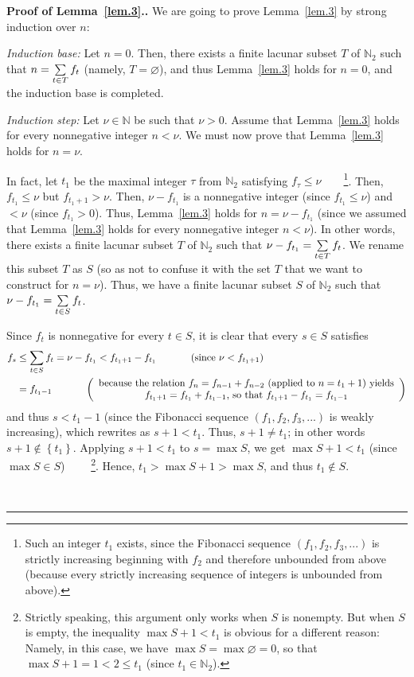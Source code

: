 \documentclass[numbers=enddot,12pt,final,onecolumn,notitlepage]{scrartcl}%
\numberwithin{exer}{section}
\theoremstyle{definition}
\newenvironment{proof}[1][Proof]{\noindent\textbf{#1.} }{\ \rule{0.5em}{0.5em}}
\let\sumnonlimits\sum
\renewcommand{\sum}{\sumnonlimits\limits}
\begin{document}
\begin{proof}[Proof of Lemma~\ref{lem.3}.] We are going to prove Lemma~\ref{lem.3} by strong induction
over $n$:

\textit{Induction base:} Let $n=0$. Then, there exists a finite lacunar subset
$T$ of $\mathbb{N}_{2}$ such that $n=\sum\limits_{t\in T}f_{t}$ (namely,
$T=\varnothing$), and thus Lemma~\ref{lem.3} holds for $n=0$, and the induction base is completed.

\textit{Induction step:} Let $\nu\in\mathbb{N}$ be such that $\nu>0$. Assume
that Lemma~\ref{lem.3} holds for every nonnegative integer $n<\nu$. We must now prove
that Lemma~\ref{lem.3} holds for $n=\nu$.

In fact, let $t_{1}$ be the maximal integer $\tau$ from $\mathbb{N}_{2}$
satisfying $f_{\tau}\leq\nu$\ \ \ \ \footnote{Such an integer $t_{1}$ exists,
since the Fibonacci sequence $\left(  f_{1},f_{2},f_{3},...\right)  $ is
strictly increasing beginning with $f_{2}$ and therefore unbounded from above
(because every strictly increasing sequence of integers is unbounded from
above).}. Then, $f_{t_{1}}\leq\nu$ but $f_{t_{1}+1}>\nu$. Then, $\nu-f_{t_{1}%
}$ is a nonnegative integer (since $f_{t_{1}}\leq\nu$) and $<\nu$ (since
$f_{t_{1}}>0$). Thus, Lemma~\ref{lem.3} holds for $n=\nu-f_{t_{1}}$ (since we assumed
that Lemma~\ref{lem.3} holds for every nonnegative integer $n<\nu$). In other words,
there exists a finite lacunar subset $T$ of $\mathbb{N}_{2}$ such that
$\nu-f_{t_{1}}=\sum\limits_{t\in T}f_{t}$. We rename this subset $T$ as $S$
(so as not to confuse it with the set $T$ that we want to construct for
$n=\nu$). Thus, we have a finite lacunar subset $S$ of $\mathbb{N}_{2}$ such
that $\nu-f_{t_{1}}=\sum\limits_{t\in S}f_{t}$.

Since $f_{t}$ is nonnegative for every $t\in S$, it is clear that every $s\in
S$ satisfies%
\begin{align*}
f_{s}  &  \leq\sum\limits_{t\in S}f_{t}=\nu-f_{t_{1}}<f_{t_{1}+1}-f_{t_{1}%
}\ \ \ \ \ \ \ \ \ \ \left(  \text{since }\nu<f_{t_{1}+1}\right) \\
&  =f_{t_{1}-1}\ \ \ \ \ \ \ \ \ \ \left(
\begin{array}
[c]{c}%
\text{because the relation }f_{n}=f_{n-1}+f_{n-2}\text{ (applied to }%
n=t_{1}+1\text{) yields}\\
f_{t_{1}+1}=f_{t_{1}}+f_{t_{1}-1}\text{, so that }f_{t_{1}+1}-f_{t_{1}%
}=f_{t_{1}-1}%
\end{array}
\right)
\end{align*}
and thus $s<t_{1}-1$ (since the Fibonacci sequence $\left(  f_{1},f_{2}%
,f_{3},...\right)  $ is weakly increasing), which rewrites as $s+1<t_{1}$.
Thus, $s+1\neq t_{1}$; in other words $s+1\notin\left\{  t_{1}\right\}  $.
Applying $s+1<t_{1}$ to $s=\max S$, we get $\max S+1<t_{1}$ (since $\max S \in
S$) \ \ \ \ \footnote{Strictly speaking, this argument only works when $S$ is
nonempty. But when $S$ is empty, the inequality $\max S + 1 < t_{1}$ is
obvious for a different reason: Namely, in this case, we have $\max S =
\max\varnothing= 0$, so that $\max S + 1 = 1 < 2 \leq t_{1}$ (since $t_{1}
\in\mathbb{N}_{2}$).}. Hence, $t_{1} > \max S + 1 > \max S$, and thus $t_{1}
\notin S$.


\end{proof}
\end{document}
